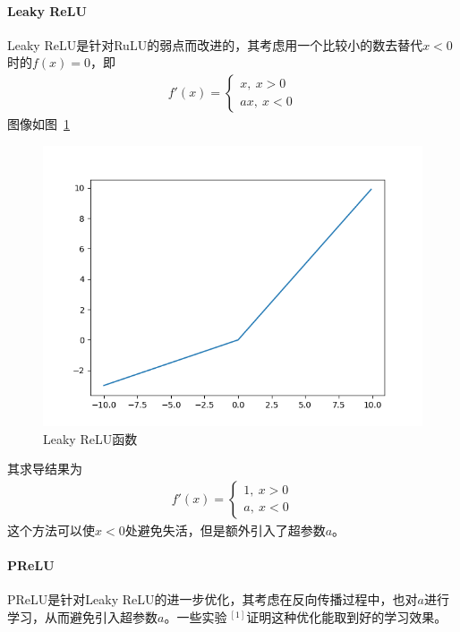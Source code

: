 \paragraph{Leaky ReLU}
Leaky ReLU是针对RuLU的弱点而改进的，其考虑用一个比较小的数去替代$x<0$时的$f(x)=0$，即
\begin{eqnarray}
f'(x)=
\left\lbrace
\begin{aligned}
x,\ x>0\\
ax,\ x<0
\end{aligned}
\right.
\end{eqnarray}
图像如图~\ref{fig:bp5}
\begin{figure}[htb]
\centering
\includegraphics[scale=0.5]{../figures/NN7.png}
\caption{Leaky ReLU函数} 
\label{fig:bp5}
\end{figure}
其求导结果为
\begin{eqnarray}
f'(x)=
\left\lbrace
\begin{aligned}
1,\ x>0\\
a,\ x<0
\end{aligned}
\right.
\end{eqnarray}
这个方法可以使$x<0$处避免失活，但是额外引入了超参数$a$。
\paragraph{PReLU}PReLU是针对Leaky ReLU的进一步优化，其考虑在反向传播过程中，也对$a$进行学习，从而避免引入超参数$a$。一些实验$\ ^{[1]}$证明这种优化能取到好的学习效果。
